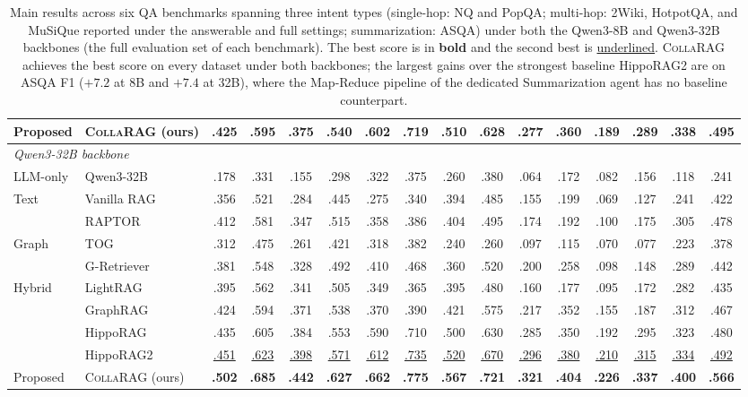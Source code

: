 \documentclass[11pt,a4paper]{article}
\newcommand{\sys}{\textsc{CollaRAG}}
\newcommand{\best}[1]{\textbf{#1}}
\newcommand{\second}[1]{\underline{#1}}
\begin{document}
\begin{table}[t]
\begin{tabular}{@{}ll cccc cccccccc cc@{}}
\midrule
Proposed & \sys{} (ours) & \best{.425} & \best{.595} & \best{.375} & \best{.540} & \best{.602} & \best{.719} & \best{.510} & \best{.628} & \best{.277} & \best{.360} & \best{.189} & \best{.289} & \best{.338} & \best{.495} \\
\midrule
\multicolumn{16}{l}{\textit{Qwen3-32B backbone}} \\
\midrule
LLM-only & Qwen3-32B     & .178 & .331 & .155 & .298 & .322 & .375 & .260 & .380 & .064 & .172 & .082 & .156 & .118 & .241 \\
\midrule
\multirow{2}{*}{Text}    & Vanilla RAG   & .356 & .521 & .284 & .445 & .275 & .340 & .394 & .485 & .155 & .199 & .069 & .127 & .241 & .422 \\
                         & RAPTOR        & .412 & .581 & .347 & .515 & .358 & .386 & .404 & .495 & .174 & .192 & .100 & .175 & .305 & .478 \\
\midrule
\multirow{2}{*}{Graph}   & TOG           & .312 & .475 & .261 & .421 & .318 & .382 & .240 & .260 & .097 & .115 & .070 & .077 & .223 & .378 \\
                         & G-Retriever   & .381 & .548 & .328 & .492 & .410 & .468 & .360 & .520 & .200 & .258 & .098 & .148 & .289 & .442 \\
\midrule
\multirow{4}{*}{Hybrid}  & LightRAG      & .395 & .562 & .341 & .505 & .349 & .365 & .395 & .480 & .160 & .177 & .095 & .172 & .282 & .435 \\
                         & GraphRAG      & .424 & .594 & .371 & .538 & .370 & .390 & .421 & .575 & .217 & .352 & .155 & .187 & .312 & .467 \\
                         & HippoRAG      & .435 & .605 & .384 & .553 & .590 & .710 & .500 & .630 & .285 & .350 & .192 & .295 & .323 & .480 \\
                         & HippoRAG2     & \second{.451} & \second{.623} & \second{.398} & \second{.571} & \second{.612} & \second{.735} & \second{.520} & \second{.670} & \second{.296} & \second{.380} & \second{.210} & \second{.315} & \second{.334} & \second{.492} \\
\midrule
Proposed & \sys{} (ours) & \best{.502} & \best{.685} & \best{.442} & \best{.627} & \best{.662} & \best{.775} & \best{.567} & \best{.721} & \best{.321} & \best{.404} & \best{.226} & \best{.337} & \best{.400} & \best{.566} \\
\bottomrule
\end{tabular}
\caption{Main results across six QA benchmarks spanning three intent types (single-hop: NQ and PopQA; multi-hop: 2Wiki, HotpotQA, and MuSiQue reported under the answerable and full settings; summarization: ASQA) under both the Qwen3-8B and Qwen3-32B backbones (the full evaluation set of each benchmark). The best score is in \textbf{bold} and the second best is \underline{underlined}. \sys{} achieves the best score on every dataset under both backbones; the largest gains over the strongest baseline HippoRAG2 are on ASQA F1 ($+7.2$ at 8B and $+7.4$ at 32B), where the Map-Reduce pipeline of the dedicated Summarization agent has no baseline counterpart.}
\label{tab:main}
\end{table}
\end{document}

